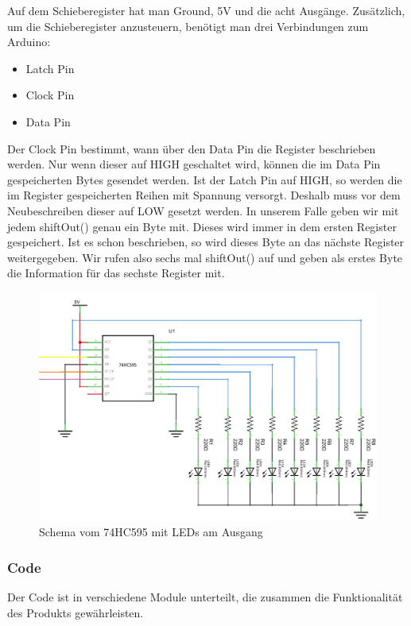 \documentclass[10pt,a4paper]{article}
\newcommand*\setcaptioncitation[1]{\def\captioncitation{\textit{Quelle:}~#1}}
\let\captioncitation\relax
\begin{document}
Auf dem Schieberegister hat man Ground, 5V und die acht Ausgänge. Zusätzlich, um die Schieberegister anzusteuern, benötigt man drei Verbindungen zum Arduino:
\begin{itemize}
\item Latch Pin
\item Clock Pin
\item Data Pin
\end{itemize}

Der Clock Pin bestimmt, wann über den Data Pin die Register beschrieben werden. Nur wenn dieser auf HIGH geschaltet wird, können die im Data Pin gespeicherten Bytes gesendet werden. Ist der Latch Pin auf HIGH, so werden die im Register gespeicherten Reihen mit Spannung versorgt. Deshalb muss vor dem Neubeschreiben dieser auf LOW gesetzt werden. In unserem Falle geben wir mit jedem shiftOut() genau ein Byte mit. Dieses wird immer in dem ersten Register gespeichert. Ist es schon beschrieben, so wird dieses Byte an das nächste Register weitergegeben. Wir rufen also sechs mal shiftOut() auf und geben als erstes Byte die Information für das sechste Register mit.

\begin{figure}
\includegraphics[width=\textwidth]{shiftReg.png}
\setcaptioncitation{arduinolearning.com/learning/basics/interfacing-74hc595.php}
\caption{Schema vom 74HC595 mit LEDs am Ausgang}
\end{figure}

\subsubsection{Code}

Der Code ist in verschiedene Module unterteilt, die zusammen die Funktionalität des Produkts gewährleisten.
\end{document}
